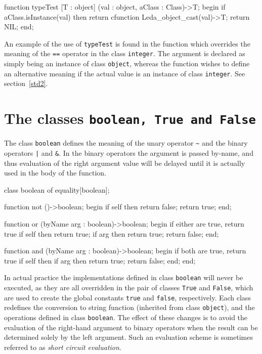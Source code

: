 \begin{cprog}

function typeTest [T : object] (val : object, aClass : Class)->T;
begin
	if aClass.isInstance(val) then
		return cfunction Leda_object_cast(val)->T;
	return NIL;
end;

\end{cprog}

An example of the use of {\tt typeTest} is found in the function
which overrides the meaning of the \verb+==+ operator in
the class {\tt integer}.  The argument is declared as simply being
an instance of class {\tt object}, whereas the function wishes to
define an alternative meaning if the actual value is an instance
of class {\tt integer}.  See section~\ref{std2}.

\section{The classes {\tt boolean, True and False}}

The class {\tt boolean} defines the meaning of the unary operator \verb+~+
and the binary operators \verb+|+ and \verb+&+.  In the binary operators
the argument is passed by-name, and thus evaluation of the right
argument value will be delayed until it is actually used in the body
of the function.

\begin{cprog}

class boolean of equality[boolean];

	function not ()->boolean;
	begin
		if self then
			return false;
		return true;
	end;

	function or (byName arg : boolean)->boolean;
	begin
			{ if either are true, return true }
		if self then
			return true;
		if arg then
			return true;
		return false;
	end;

	function and (byName arg : boolean)->boolean;
	begin
			{ if both are true, return true }
		if self then
			if arg then
				return true;
		return false;
	end;
end;

\end{cprog}

In actual practice the implementations defined in class {\tt boolean} will
never be executed, as they are all overridden in the pair of classes
{\tt True} and {\tt False}, which are used to create the global constants
{\tt true} and {\tt false}, respectively.  Each class redefines
the conversion to string function (inherited from class {\tt object}),
and the operations defined in class {\tt boolean}.  The effect of
these changes is to avoid the evaluation of the right-hand argument to
binary operators when the result can be determined solely by the left
argument.  Such an evaluation scheme is sometimes referred to as
{\em short circuit evaluation}.

